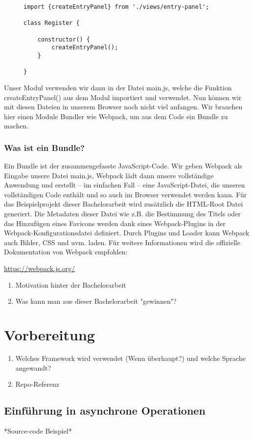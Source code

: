 \begin{figure}[H]
\begin{lstlisting}
import {createEntryPanel} from './views/entry-panel';

class Register {

    constructor() {
        createEntryPanel();
    }
    
}
\end{lstlisting}
\end{figure}

Unser Modul verwenden wir dann in der Datei main.js, welche die Funktion createEntryPanel() aus dem Modul importiert und verwendet. Nun können wir mit diesen Dateien in unserem Browser noch nicht viel anfangen. Wir brauchen hier einen Module Bundler wie Webpack, um aus dem Code ein Bundle zu machen.

\subsubsection{Was ist ein Bundle?}

Ein Bundle ist der zusammengefasste JavaScript-Code. Wir geben Webpack als Eingabe unsere Datei main.js, Webpack  lädt dann unsere vollständige Anwendung und erstellt – im einfachen Fall – eine JavaScript-Datei, die unseren vollständigen Code enthält und so auch im Browser verwendet werden kann.\cite{Webpack-basics}
Für das Beispielprojekt dieser Bachelorarbeit wird zusätzlich die HTML-Root Datei generiert. Die Metadaten dieser Datei wie z.B. die Bestimmung des Titels oder das Hinzufügen eines Favicons werden dank eines Webpack-Plugins in der Webpack-Konfigurationsdatei definiert. Durch Plugins und Loader kann Webpack auch Bilder, CSS und uvm. laden.
Für weitere Informationen wird die offizielle Dokumentation von Webpack empfohlen:

\begin{center}
\url{https://webpack.js.org/}
\end{center}

\begin{enumerate} 
\item Motivation hinter der Bachelorarbeit
\item Was kann man aus dieser Bachelorarbeit "gewinnen"?
\end{enumerate}

\section{Vorbereitung}
\begin{enumerate} 
\item Welches Framework wird verwendet (Wenn überhaupt?) und welche Sprache angewandt?
\item Repo-Referenz
\end{enumerate}

\subsection{Einführung in asynchrone Operationen}
*Source-code Beispiel*